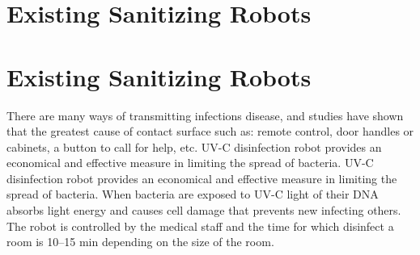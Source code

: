 \documentclass[letterpaper]{article} %
\begin{document}
\section{Existing Sanitizing Robots} 
\section{Existing Sanitizing Robots} 
\label{sec:Literature}
There are many ways of transmitting infections disease, and studies have shown that the greatest cause of contact surface such as: remote control, door handles or cabinets, a button to call for help, etc. UV-C disinfection robot provides an economical and effective measure in limiting the spread of bacteria.  UV-C disinfection robot provides an economical and effective measure in limiting the spread of bacteria. When bacteria are exposed to UV-C light of their DNA absorbs light energy and causes cell damage that prevents new infecting others. The robot is controlled by the medical staff and the time for which disinfect a room is 10–15 min depending on the size of the room. 
\end{document}

